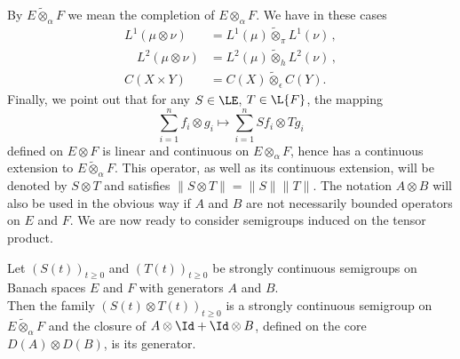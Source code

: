 By $E \widetilde{\otimes}_{\alpha} F$ we mean the completion of\/ $E \otimes_{\alpha} F$. 
We have in these cases
\begin{align*}
    L^{1}(\mu \otimes \nu) &= L^{1}(\mu) \widetilde{\otimes}_{\pi} L^{1}(\nu)\,,\\
    \quad L^{2}(\mu \otimes \nu) &= L^{2}(\mu) \widetilde{\otimes}_{h} L^{2}(\nu)\,,\\
    C(X \times Y) &= C(X) \widetilde{\otimes}_{\epsilon} C(Y).
\end{align*}
Finally, we point out that for any $S \in \LE$, $T \in \L{F} $, the mapping
\[
    \sum_{i=1}^{n}f_{i} \otimes g_{i} \mapsto \sum_{i=1}^{n}Sf_{i} \otimes Tg_{i}
\]
defined on $E \otimes F$ is linear and continuous on $E \otimes_{\alpha} F$, hence has a continuous extension to $ E \widetilde{\otimes}_{\alpha} F$. 
This operator, as well as its continuous extension, will be denoted by $S \otimes T$ and satisfies $\|S \otimes T\| = \|S\| \|T\|$. 
The notation $A \otimes B$ will also be used in the obvious way if\/ $A$ and $B$ are not necessarily bounded operators on $E$ and $F$. 
We are now ready to consider semigroups induced on the tensor product.
\begin{proposition*}\label{prop:a1-3.7}
Let $(S(t))_{t\geq 0}$ and $(T(t))_{t\geq 0}$ be strongly continuous semigroups on Banach spaces $E$ and $F$ with generators $A$ and $B$.\\ 
Then the family $(S(t) \otimes T(t))_{t\geq 0}$ is a strongly continuous semigroup on 
$ E \widetilde{\otimes}_{\alpha} F $ and 
the closure of\/ $A \otimes \Id + \Id \otimes B$, defined on the core $D(A) \otimes D(B)$, is its generator.
\end{proposition*}
